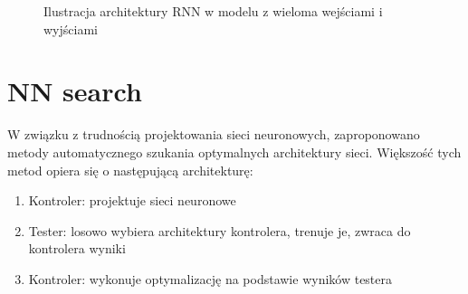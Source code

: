 \documentclass{../notatki}
\begin{document}
\begin{figure}
{
  }
  \caption{Ilustracja architektury RNN w modelu z wieloma wejściami i wyjściami}
\end{figure}

\section{NN search}

W związku z trudnością projektowania sieci neuronowych, zaproponowano
metody automatycznego szukania optymalnych architektury sieci.
Większość tych metod opiera się o następującą architekturę:
\begin{enumerate}
  \item Kontroler: projektuje sieci neuronowe
  \item Tester: losowo wybiera architektury kontrolera, trenuje je,
    zwraca do kontrolera wyniki
  \item Kontroler: wykonuje optymalizację na podstawie wyników testera
\end{enumerate}
\end{document}
